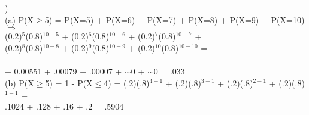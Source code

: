 \documentclass[12pt]{article}
\begin{document}
\noindent \hrulefill 
\pagebreak


)\\
\indent (a) P(X$\ge$5) = P(X=5) + P(X=6) + P(X=7) + P(X=8) + P(X=9) + P(X=10) $\Rightarrow$\\[.4em]
\indent {}(0.2)$^{5}$(0.8)$^{10-5}$ +
(0.2)$^{6}$(0.8)$^{10-6}$ +
(0.2)$^{7}$(0.8)$^{10-7}$ +\\[.4em]
\indent {}(0.2)$^{8}$(0.8)$^{10-8}$ +
(0.2)$^{9}$(0.8)$^{10-9}$ +
(0.2)$^{10}$(0.8)$^{10-10}$ =\\\\
\indent {} + 0.00551 + .00079 + .00007 + $\sim$0 + $\sim$0 = .033\\

\indent (b) P(X$\ge$5) = 1 - P(X$\le$4) = (.2)(.8)$^{4-1}$ + (.2)(.8)$^{3-1}$ + (.2)(.8)$^{2-1}$ + (.2)(.8)$^{1-1}$ =\\[.4em]
\indent \indent .1024 + .128 + .16 + .2 = .5904
\end{document}
